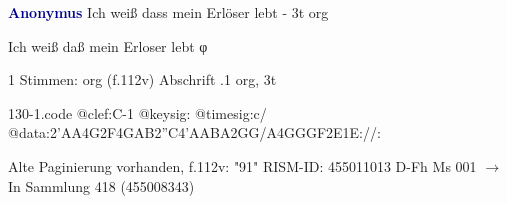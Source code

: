 \documentclass[twocolumn]{book}
\begin{document}
\newline \par \vspace{7pt} \textcolor{darkblue}{\textbf{Anonymus  }}
\newline Ich weiß dass mein Erlöser lebt - 3t
\newline org
\newline \begin{itshape}[f.112v, heading:] Ich weiß daß mein Erloser lebt φ\end{itshape} 
\newline \textcolor{darkblue}{}  1 Stimmen: org  (f.112v)
\newline Abschrift
.1  org, 3t  
\begin{filecontents*}{130-1.code}
@clef:C-1
@keysig:
@timesig:c/
@data:2'AA4G2F4GAB2''C4'AABA2GG/A4GGGF2E1E://:
\end{filecontents*}
\newline
%
\newline Alte Paginierung vorhanden, f.112v: "91"
\newline RISM-ID: 455011013
\newline D-Fh  Ms 001
\newline $\rightarrow$ In Sammlung 418 (455008343)
      
\end{document}
